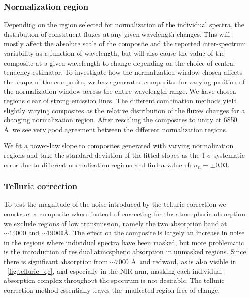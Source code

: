 \documentclass{aa}    %
\newcommand{\figref}[1]{\ref{fig:#1}}
\newcommand{\Fig}[1]{\figurename~\figref{#1}}
\newcommand{\fig}[1]{\Fig{#1}}
\newcommand{\sectlabel}[1]{\label{sect:#1}}
\begin{document}
\subsubsection{Normalization region}  \sectlabel{Normalisation region}
Depending on the region selected for normalization of the individual
spectra, the distribution of constituent fluxes at any given
wavelength changes. This will mostly affect the absolute scale of the
composite and the reported inter-spectrum variability as a function of
wavelength, but will also cause the value of the composite at a given
wavelength to change depending on the choice of central tendency
estimator. To investigate how the normalization-window chosen affects
the shape of the composite, we have generated composites for varying
position of the normalization-window across the entire wavelength
range. We have chosen regions clear of strong emission lines. The
different combination methods yield slightly varying composites as the
relative distribution of the fluxes changes for a changing
normalization region. After rescaling the composites to unity at 6850
\AA~we see very good agreement between the different normalization
regions.


 We fit a power-law slope to composites generated with varying normalization
regions and take the standard deviation of the fitted slopes as the 1-$\sigma$
systematic error due to different normalization regions and find a value of:
$\sigma_{n} = \pm 0.03$.



\subsubsection{Telluric correction}  \sectlabel{Telluric correction}
To test the magnitude of the noise introduced by the telluric correction we
construct a composite where instead of correcting for the atmospheric absorption
we exclude regions of low transmission, namely the two absorption band at $\sim
14000$ and $\sim 19000$\AA. The effect on the composite is largely an increase
in noise in the regions where individual spectra have been masked, but more
problematic is the introduction of residual atmospheric absorption in unmasked
regions. Since there is significant absorption from $\sim 7000$ \AA~and
redward, as is also visible in \fig{telluric_qc}, and especially in the NIR
arm, masking each individual absorption complex throughout the spectrum is not
desirable. The telluric correction method essentially leaves the unaffected
region free of change. 
\end{document}
